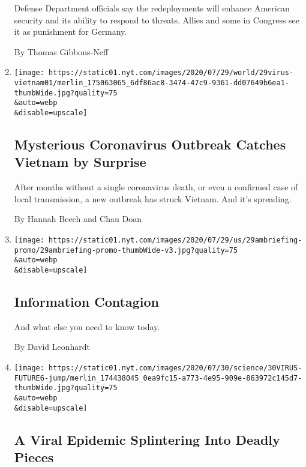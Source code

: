 \begin{enumerate}
  Defense Department officials say the redeployments will enhance
  American security and its ability to respond to threats. Allies and
  some in Congress see it as punishment for Germany.

  By Thomas Gibbons-Neff
\item
  \href{/2020/07/29/world/asia/coronavirus-vietnam.html}{}

  \texttt{[image: https://static01.nyt.com/images/2020/07/29/world/29virus-vietnam01/merlin\_175063065\_6df86ac8-3474-47c9-9361-dd07649b6ea1-thumbWide.jpg?quality=75\\\&auto=webp\\\&disable=upscale]}

  \hypertarget{mysterious-coronavirus-outbreak-catches-vietnam-by-surprise}{%
  \subsection{Mysterious Coronavirus Outbreak Catches Vietnam by
  Surprise}\label{mysterious-coronavirus-outbreak-catches-vietnam-by-surprise}}

  After months without a single coronavirus death, or even a confirmed
  case of local transmission, a new outbreak has struck Vietnam. And
  it's spreading.

  By Hannah Beech and Chau Doan
\item
  \href{/2020/07/29/briefing/coronavirus-william-barr-emmy-nominations-your-wednesday-briefing.html}{}

  \texttt{[image: https://static01.nyt.com/images/2020/07/29/us/29ambriefing-promo/29ambriefing-promo-thumbWide-v3.jpg?quality=75\\\&auto=webp\\\&disable=upscale]}

  \hypertarget{information-contagion}{%
  \subsection{Information Contagion}\label{information-contagion}}

  And what else you need to know today.

  By David Leonhardt
\item
  \href{/2020/07/29/health/coronavirus-future-america.html}{}

  \texttt{[image: https://static01.nyt.com/images/2020/07/30/science/30VIRUS-FUTURE6-jump/merlin\_174438045\_0ea9fc15-a773-4e95-909e-863972c145d7-thumbWide.jpg?quality=75\\\&auto=webp\\\&disable=upscale]}

  \hypertarget{a-viral-epidemic-splintering-into-deadly-pieces}{%
  \subsection{A Viral Epidemic Splintering Into Deadly
  Pieces}\label{a-viral-epidemic-splintering-into-deadly-pieces}}


\end{enumerate}
